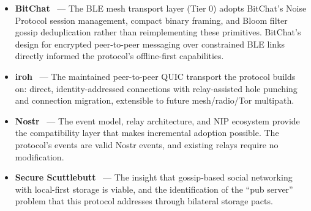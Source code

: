 \documentclass[11pt,a4paper]{article}
\begin{document}
\begin{itemize}
  \item \textbf{BitChat}~\cite{bitchat} --- The BLE mesh transport layer (Tier 0) adopts BitChat's Noise Protocol session management, compact binary framing, and Bloom filter gossip deduplication rather than reimplementing these primitives. BitChat's design for encrypted peer-to-peer messaging over constrained BLE links directly informed the protocol's offline-first capabilities.
  \item \textbf{iroh}~\cite{iroh} --- The maintained peer-to-peer QUIC transport the protocol builds on: direct, identity-addressed connections with relay-assisted hole punching and connection migration, extensible to future mesh/radio/Tor multipath.
  \item \textbf{Nostr}~\cite{nostr} --- The event model, relay architecture, and NIP ecosystem provide the compatibility layer that makes incremental adoption possible. The protocol's events are valid Nostr events, and existing relays require no modification.
  \item \textbf{Secure Scuttlebutt}~\cite{ssb} --- The insight that gossip-based social networking with local-first storage is viable, and the identification of the ``pub server'' problem that this protocol addresses through bilateral storage pacts.
\end{itemize}
\end{document}

